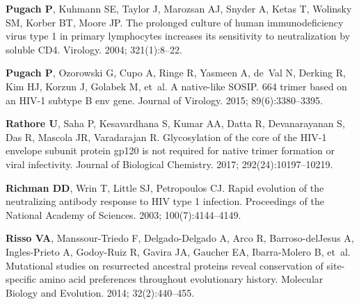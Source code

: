 \documentclass[9pt]{elife}
\begin{document}
\begin{thebibliography}{114}
\textbf{\color{eLifeMediumGrey} Pugach P}, Kuhmann SE, Taylor J, Marozsan AJ,
  Snyder A, Ketas T, Wolinsky SM, Korber BT, Moore JP.
\newblock The prolonged culture of human immunodeficiency virus type 1 in
  primary lymphocytes increases its sensitivity to neutralization by soluble
  CD4.
\newblock Virology.  2004; 321(1):8--22.

\textbf{\color{eLifeMediumGrey} Pugach P}, Ozorowski G, Cupo A, Ringe R,
  Yasmeen A, de~Val N, Derking R, Kim HJ, Korzun J, Golabek M, et~al.
\newblock A native-like SOSIP. 664 trimer based on an HIV-1 subtype B env gene.
\newblock Journal of Virology.  2015; 89(6):3380--3395.

\textbf{\color{eLifeMediumGrey} Rathore U}, Saha P, Kesavardhana S, Kumar AA,
  Datta R, Devanarayanan S, Das R, Mascola JR, Varadarajan R.
\newblock Glycosylation of the core of the HIV-1 envelope subunit protein gp120
  is not required for native trimer formation or viral infectivity.
\newblock Journal of Biological Chemistry.  2017; 292(24):10197--10219.

\textbf{\color{eLifeMediumGrey} Richman DD}, Wrin T, Little SJ, Petropoulos CJ.
\newblock Rapid evolution of the neutralizing antibody response to HIV type 1
  infection.
\newblock Proceedings of the National Academy of Sciences.  2003;
  100(7):4144--4149.

\textbf{\color{eLifeMediumGrey} Risso VA}, Manssour-Triedo F, Delgado-Delgado
  A, Arco R, Barroso-delJesus A, Ingles-Prieto A, Godoy-Ruiz R, Gavira JA,
  Gaucher EA, Ibarra-Molero B, et~al.
\newblock Mutational studies on resurrected ancestral proteins reveal
  conservation of site-specific amino acid preferences throughout evolutionary
  history.
\newblock Molecular Biology and Evolution.  2014; 32(2):440--455.


\end{thebibliography}
\end{document}
